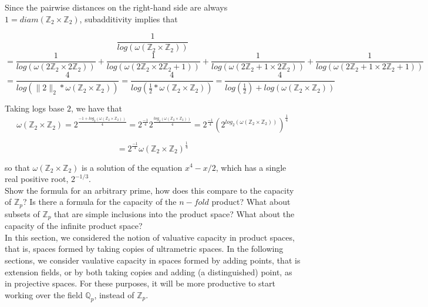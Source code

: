 Since the pairwise distances on the right-hand side are always $1 = diam(\mathbb{Z}_2 \times \mathbb{Z}_2)$, subadditivity implies that 

\[
\frac{1}{log(\omega(\mathbb{Z}_2 \times \mathbb{Z}_2))} \]
\[ = \frac{1}{log(\omega(2\mathbb{Z}_2 \times 2\mathbb{Z}_2))} + \frac{1}{log(\omega(2\mathbb{Z}_2 \times 2\mathbb{Z}_2 +1))} + \frac{1}{log(\omega(2\mathbb{Z}_2+1 \times 2\mathbb{Z}_2))} + \frac{1}{log(\omega(2\mathbb{Z}_2+1 \times 2\mathbb{Z}_2+1))}\]
\[ = \frac{4}{log(\|2\|_2 * \omega(\mathbb{Z}_2 \times \mathbb{Z}_2))} = \frac{4}{log(\frac{1}{2} * \omega(\mathbb{Z}_2 \times \mathbb{Z}_2))} =  \frac{4}{log(\frac{1}{2}) + log(\omega(\mathbb{Z}_2 \times \mathbb{Z}_2))}\]

 Taking logs base $2$, we have that 
\[\omega(\mathbb{Z}_2 \times \mathbb{Z}_2) = 2^{\frac{-1 + log_2(\omega(\mathbb{Z}_2 \times \mathbb{Z}_2))}{4}} =  2^{\frac{-1}{4}} 2^ {\frac{log_2(\omega(\mathbb{Z}_2 \times \mathbb{Z}_2))}{4}}
= 2^{\frac{-1}{4}}{(2^ {log_2(\omega(\mathbb{Z}_2 \times \mathbb{Z}_2))})}^{\frac{1}{4}}\]

\[ = 2^{\frac{-1}{4}}{\omega(\mathbb{Z}_2 \times \mathbb{Z}_2)}^{\frac{1}{4}} \]

so that ${\omega(\mathbb{Z}_2 \times \mathbb{Z}_2)}$ is a solution of the equation $x^4 - x/2$, which has a single real positive root, $2^{-1/3}$.\\

Show the formula for an arbitrary prime, how does this compare to the capacity of $\mathbb{Z}_p$? Is there a formula for the capacity of the $n-fold$ product?
 What about subsets of $\mathbb{Z}_p$ that are simple inclusions into the product space? What about the capacity of the infinite product space?\\


In this section, we considered the notion of valuative capacity in product spaces, that is, spaces formed by taking copies of ultrametric spaces. In the following sections, we consider  vaulative capacity in spaces formed by adding points, that is extension fields, or by both taking copies and adding (a distinguished) point, as in projective spaces. For these purposes, it will be more productive to start working over the field $\mathbb{Q}_p$, instead of $\mathbb{Z}_p$.
